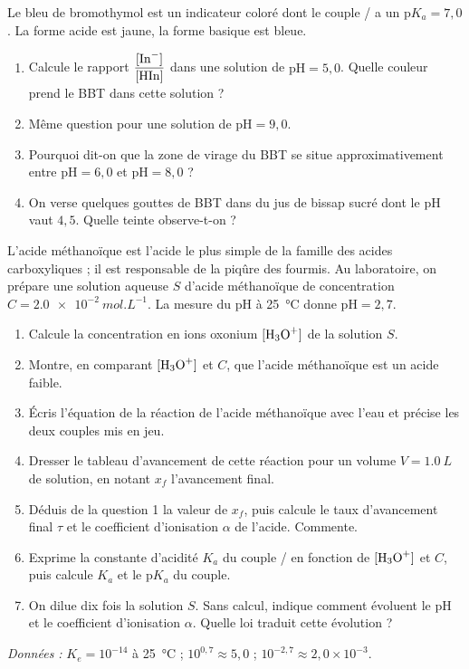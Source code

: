 \documentclass[11pt]{article}
\newcounter{popsec}
\newcounter{popsub}
\newcommand{\courssub}[1]{%
  \stepcounter{popsub}%
  \par\vspace{9pt}\noindent{\popxbold\fontsize{11.5}{13}\selectfont\color{popink}{\color{poporange}\thepopsec.\thepopsub}\hspace{6pt}#1}\par\nopagebreak\vspace{4pt}
}
\begin{document}
\begin{exercice}
Le bleu de bromothymol est un indicateur coloré dont le couple / a un $\mathrm{p}K_a = 7,0$. La forme acide  est jaune, la forme basique  est bleue.
\begin{enumerate}
\item Calcule le rapport $\dfrac{[\ce{In-}]}{[\ce{HIn}]}$ dans une solution de $\mathrm{pH} = 5,0$. Quelle couleur prend le BBT dans cette solution ?
\item Même question pour une solution de $\mathrm{pH} = 9,0$.
\item Pourquoi dit-on que la zone de virage du BBT se situe approximativement entre $\mathrm{pH} = 6,0$ et $\mathrm{pH} = 8,0$ ?
\item On verse quelques gouttes de BBT dans du jus de bissap sucré dont le pH vaut $4,5$. Quelle teinte observe-t-on ?
\end{enumerate}
\end{exercice}

\courssub{Je me prépare au Bac}

\begin{exercice}
L'acide méthanoïque  est l'acide le plus simple de la famille des acides carboxyliques ; il est responsable de la piqûre des fourmis. Au laboratoire, on prépare une solution aqueuse $S$ d'acide méthanoïque de concentration $C = \SI{2,0e-2}{mol.L^{-1}}$. La mesure du pH à \SI{25}{\celsius} donne $\mathrm{pH} = 2,7$.
\begin{enumerate}
\item Calcule la concentration en ions oxonium $[\ce{H3O+}]$ de la solution $S$.
\item Montre, en comparant $[\ce{H3O+}]$ et $C$, que l'acide méthanoïque est un acide faible.
\item Écris l'équation de la réaction de l'acide méthanoïque avec l'eau et précise les deux couples mis en jeu.
\item Dresser le tableau d'avancement de cette réaction pour un volume $V = \SI{1,0}{L}$ de solution, en notant $x_f$ l'avancement final.
\item Déduis de la question 1 la valeur de $x_f$, puis calcule le taux d'avancement final $\tau$ et le coefficient d'ionisation $\alpha$ de l'acide. Commente.
\item Exprime la constante d'acidité $K_a$ du couple / en fonction de $[\ce{H3O+}]$ et $C$, puis calcule $K_a$ et le $\mathrm{p}K_a$ du couple.
\item On dilue dix fois la solution $S$. Sans calcul, indique comment évoluent le pH et le coefficient d'ionisation $\alpha$. Quelle loi traduit cette évolution ?
\end{enumerate}
\emph{Données :} $K_e = 10^{-14}$ à \SI{25}{\celsius} ; $10^{0,7} \approx 5,0$ ; $10^{-2,7} \approx 2,0\times 10^{-3}$.
\end{exercice}
\end{document}
